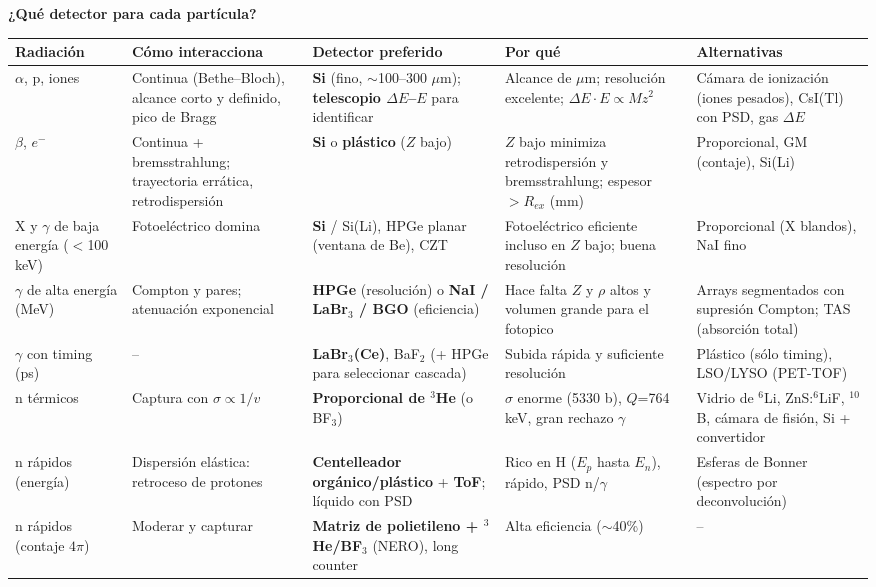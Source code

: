 \documentclass[10pt,a4paper,landscape]{article}
\begin{document}
\newpage
\begin{center}{\Large\bfseries\color{NavyBlue} ¿Qué detector para cada partícula?}\end{center}
\renewcommand{\arraystretch}{1.08}
{\small
\begin{tabularx}{\linewidth}{P{3.0cm}P{4.3cm}P{5.2cm}LP{4.2cm}}
\toprule
\textbf{Radiación} & \textbf{Cómo interacciona} & \textbf{Detector preferido} & \textbf{Por qué} & \textbf{Alternativas}\\
\midrule
$\alpha$, p, iones & Continua (Bethe--Bloch), alcance corto y definido, pico de Bragg & \textbf{Si} (fino, $\sim$100--300 $\mu$m); \textbf{telescopio $\Delta E$--$E$} para identificar & Alcance de $\mu$m; resolución excelente; $\Delta E\cdot E\propto Mz^2$ & Cámara de ionización (iones pesados), CsI(Tl) con PSD, gas $\Delta E$\\
$\beta$, $e^-$ & Continua + bremsstrahlung; trayectoria errática, retrodispersión & \textbf{Si} o \textbf{plástico} ($Z$ bajo) & $Z$ bajo minimiza retrodispersión y bremsstrahlung; espesor $>R_{ex}$ (mm) & Proporcional, GM (contaje), Si(Li)\\
X y $\gamma$ de baja energía ($<$100 keV) & Fotoeléctrico domina & \textbf{Si} / Si(Li), HPGe planar (ventana de Be), CZT & Fotoeléctrico eficiente incluso en $Z$ bajo; buena resolución & Proporcional (X blandos), NaI fino\\
$\gamma$ de alta energía (MeV) & Compton y pares; atenuación exponencial & \textbf{HPGe} (resolución) o \textbf{NaI / LaBr$_3$ / BGO} (eficiencia) & Hace falta $Z$ y $\rho$ altos y volumen grande para el fotopico & Arrays segmentados con supresión Compton; TAS (absorción total)\\
$\gamma$ con timing (ps) & -- & \textbf{LaBr$_3$(Ce)}, BaF$_2$ (+ HPGe para seleccionar cascada) & Subida rápida y suficiente resolución & Plástico (sólo timing), LSO/LYSO (PET-TOF)\\
n térmicos & Captura con $\sigma\propto1/v$ & \textbf{Proporcional de $^3$He} (o BF$_3$) & $\sigma$ enorme (5330 b), $Q$=764 keV, gran rechazo $\gamma$ & Vidrio de $^6$Li, ZnS:$^6$LiF, $^{10}$B, cámara de fisión, Si + convertidor\\
n rápidos (energía) & Dispersión elástica: retroceso de protones & \textbf{Centelleador orgánico/plástico} + \textbf{ToF}; líquido con PSD & Rico en H ($E_p$ hasta $E_n$), rápido, PSD n/$\gamma$ & Esferas de Bonner (espectro por deconvolución)\\
n rápidos (contaje $4\pi$) & Moderar y capturar & \textbf{Matriz de polietileno + $^3$He/BF$_3$} (NERO), long counter & Alta eficiencia ($\sim$40\%) & --\\
\bottomrule
\end{tabularx}}
\end{document}
